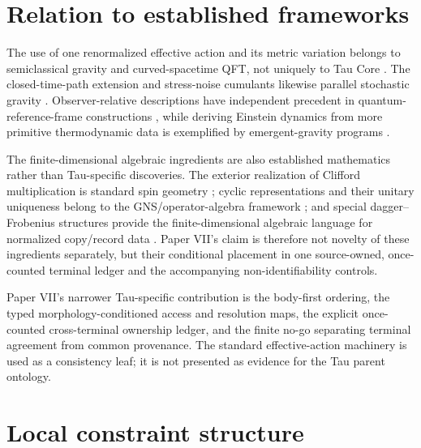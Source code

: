 \section{Relation to established frameworks}

The use of one renormalized effective action and its metric variation belongs
to semiclassical gravity and curved-spacetime QFT, not uniquely to Tau Core
\citep{Wald1977,BirrellDavies1982,HollandsWald2001}.  The closed-time-path
extension and stress-noise cumulants likewise parallel stochastic gravity
\citep{HuVerdaguer2008}.  Observer-relative descriptions have independent
precedent in quantum-reference-frame constructions
\citep{GiacominiCastroRuizBrukner2019}, while deriving Einstein dynamics from
more primitive thermodynamic data is exemplified by emergent-gravity programs
\citep{Jacobson1995}.

The finite-dimensional algebraic ingredients are also established
mathematics rather than Tau-specific discoveries.  The exterior realization
of Clifford multiplication is standard spin geometry
\citep{LawsonMichelsohn1989}; cyclic representations and their unitary
uniqueness belong to the GNS/operator-algebra framework
\citep{BratteliRobinson1979}; and special dagger--Frobenius structures provide
the finite-dimensional algebraic language for normalized copy/record data
\citep{Vicary2011,CoeckePavlovicVicary2013}.  Paper VII's claim is therefore
not novelty of these ingredients separately, but their conditional placement
in one source-owned, once-counted terminal ledger and the accompanying
non-identifiability controls.

Paper VII's narrower Tau-specific contribution is the body-first ordering,
the typed morphology-conditioned access and resolution maps, the explicit
once-counted cross-terminal ownership ledger, and the finite no-go separating
terminal agreement from common provenance.  The standard effective-action
machinery is used as a consistency leaf; it is not presented as evidence for
the Tau parent ontology.

\section{Local constraint structure}

